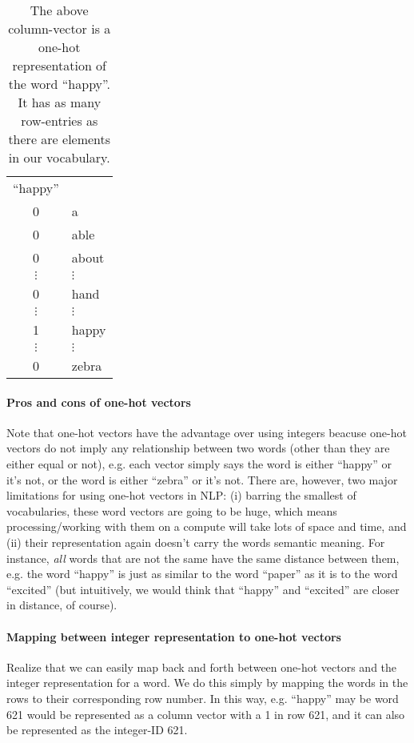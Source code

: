 \documentclass[12pt]{article}
\begin{document}
\begin{table}[h]
  \begin{center}
    \begin{tabular}{c l}
      ``happy'' & \\
      0 & a \\
      0 & able \\
      0 & about \\
      $\vdots$ & $\vdots$ \\
      0 & hand \\
      $\vdots$ & $\vdots$ \\      
      1 & happy \\
      $\vdots$ & $\vdots$ \\
      0 & zebra \\
    \end{tabular}
    \caption{The above column-vector is a one-hot representation of the word ``happy''. It has as many row-entries as there are elements in our vocabulary.}
  \end{center}
\end{table}

\paragraph{Pros and cons of one-hot vectors}
Note that one-hot vectors have the advantage over using integers beacuse one-hot vectors do not imply any relationship between two words (other than they are either equal or not), e.g. each vector simply says the word is either ``happy'' or it's not, or the word is either ``zebra'' or it's not. There are, however, two major limitations for using one-hot vectors in NLP: (i) barring the smallest of vocabularies, these word vectors are going to be huge, which means processing/working with them on a compute will take lots of space and time, and (ii) their representation again doesn't carry the words semantic meaning. For instance, \emph{all} words that are not the same have the same distance between them, e.g. the word ``happy'' is just as similar to the word ``paper'' as it is to the word ``excited'' (but intuitively, we would think that ``happy'' and ``excited'' are closer in distance, of course).

\paragraph{Mapping between integer representation to one-hot vectors} Realize that we can easily map back and forth between one-hot vectors and the integer representation for a word. We do this simply by mapping the words in the rows to their corresponding row number. In this way, e.g. ``happy'' may be word 621 would be represented as a column vector with a 1 in row 621, and it can also be represented as the integer-ID 621. 
\end{document}
